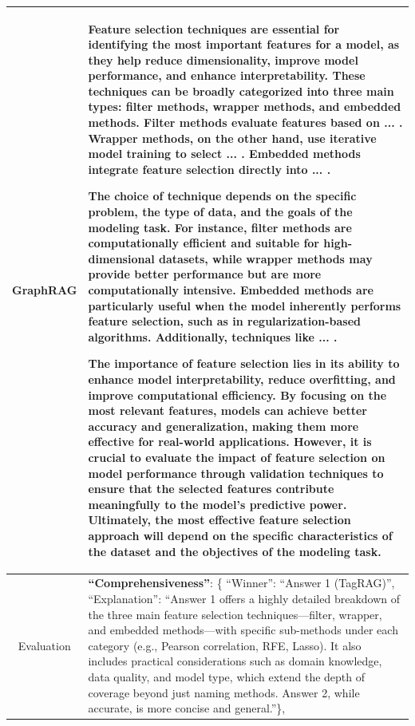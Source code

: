 \documentclass[11pt]{article}
\begin{document}
\begin{table}[h]
\begin{tabularx}{\textwidth}{p{2cm}|X}
    \hline
    
    \multicolumn{1}{c|}{GraphRAG} &  Feature selection techniques are essential for identifying the most important features for a model, as they help reduce dimensionality, improve model performance, and enhance interpretability. These techniques can be broadly categorized into three main types: filter methods, wrapper methods, and embedded methods. Filter methods evaluate features based on ... . Wrapper methods, on the other hand, use iterative model training to select ... . Embedded methods integrate feature selection directly into ... .
    
    The choice of technique depends on the specific problem, the type of data, and the goals of the modeling task. For instance, filter methods are computationally efficient and suitable for high-dimensional datasets, while wrapper methods may provide better performance but are more computationally intensive. Embedded methods are particularly useful when the model inherently performs feature selection, such as in regularization-based algorithms. Additionally, techniques like ... .
    
    The importance of feature selection lies in its ability to enhance model interpretability, reduce overfitting, and improve computational efficiency. By focusing on the most relevant features, models can achieve better accuracy and generalization, making them more effective for real-world applications. However, it is crucial to evaluate the impact of feature selection on model performance through validation techniques to ensure that the selected features contribute meaningfully to the model's predictive power. Ultimately, the most effective feature selection approach will depend on the specific characteristics of the dataset and the objectives of the modeling task. \\ 
    
    \hline
    
    \multicolumn{1}{c|}{Evaluation} & \textbf{``Comprehensiveness''}: \{ ``Winner'': ``Answer 1 (TagRAG)'', ``Explanation'': ``Answer 1 offers a highly detailed breakdown of the three main feature selection techniques—filter, wrapper, and embedded methods—with specific sub-methods under each category (e.g., Pearson correlation, RFE, Lasso). It also includes practical considerations such as domain knowledge, data quality, and model type, which extend the depth of coverage beyond just naming methods. Answer 2, while accurate, is more concise and general.''\},
    

\end{tabularx}
\end{table}
\end{document}
